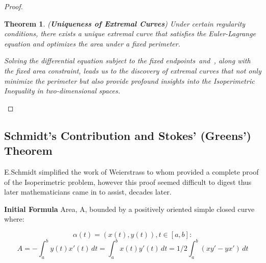 \documentclass[a4paper]{book}
\newtheorem{theorem}{Theorem}%
\begin{document}
\begin{proof}
    \begin{theorem}(\textbf{Uniqueness of Extremal Curves})
        Under certain regularity conditions, there exists a unique extremal curve that satisfies the Euler-Lagrange equation and optimizes the area under a fixed perimeter.

        Solving the differential equation subject to the fixed endpoints~\cite{goldstein1980classical}and~\cite{hilbert1985methods}, along with the fixed area constraint, leads us to the discovery of extremal curves that not only minimize the perimeter but also provide profound insights into the Isoperimetric Inequality in two-dimensional spaces.
    \end{theorem}
\end{proof}

\subsection{Schmidt's Contribution and Stokes' (Greens') Theorem}
E.Schmidt simplified the work of Weierstrass to whom provided a complete proof of the Isoperimetric problem, however this proof seemed difficult to digest thus later mathematicians came in to assist, decades later.

\textbf{Initial Formula}
Area, A, bounded by a positively oriented simple closed curve where: 

\[\alpha(t)=(x(t),y(t)), t\in [a,b]:\]
\[ A = -\int_{a}^{b} y(t)x'(t) \, dt = \int_{a}^{b} x(t)y'(t) \, dt = 1/2\int_{a}^{b} (xy'-yx') \, dt \]
\end{document}
